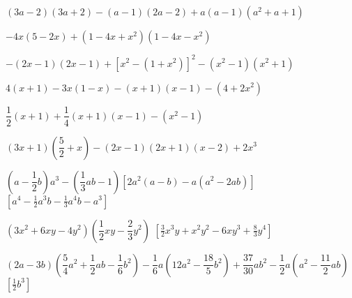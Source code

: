 \begin{esercizio}[\Ast]
\begin{enumeratea}
 \item \((3a-2)(3a+2)-(a-1)(2a-2)+a(a-1)\left(a^{2}+a+1\right)\)
 \item \(-4x(5-2x)+\left(1-4x+x^{2}\right)\left(1-4x-x^{2}\right)\)
 \item 
\(-(2x-1)(2x-1)+\left[x^{2}-\left(1+x^{2}\right)\right]^{2}-\left(x^{2}
-1\right)\left(x^{2}+1\right)\)
% 
 \item \(4(x+1)-3x(1-x)-(x+1)(x-1)-\left(4+2x^{2}\right)\)
 \item \(\dfrac{1}{2}(x+1)+\dfrac{1}{4}(x+1)(x-1)-\left(x^{2}-1\right)\)
 \item \((3x+1)\left(\dfrac{5}{2}+x\right)-(2x-1)(2x+1)(x-2)+2x^{3}\)
 \item \(\left(a-\dfrac{1}{2}b\right)a^{3}-\left(\dfrac{1}{3}{ab}-1\right)
 \left[2a^{2}(a-b)-a\left(a^{2}-2{ab}\right)\right]\)
  \hfill \(\left[a^{4}-\frac{1}{2}a^{3}b-\frac{1}{3}a^{4}b-a^{3}\right]\)
 \item \(\left(3x^2+6xy-4y^2\right)\left(\dfrac{1}{2}xy-\dfrac{2}{3}y^2\right)\)
  \hfill \(\left[\frac{3}{2}x^{3}y+x^{2}y^{2}-6{xy}^{3}+\frac{8}{3}y^{4}\right]\)
 \item \((2a-3b)\left(\dfrac{5}{4}a^{2}+\dfrac{1}{2}{ab}-
        \dfrac{1}{6}b^{2}\right)-\dfrac{1}{6}a\left(12a^{2}-
        \dfrac{18}{5}b^{2}\right)+\dfrac{37}{30}ab^{2}-
        \dfrac{1}{2}a\left(a^{2}-\dfrac{11}{2}{ab}\right)\)
  \hfill \(\left[\frac{1}{2}b^{3}\right]\)
 \end{enumeratea}
\end{esercizio}

